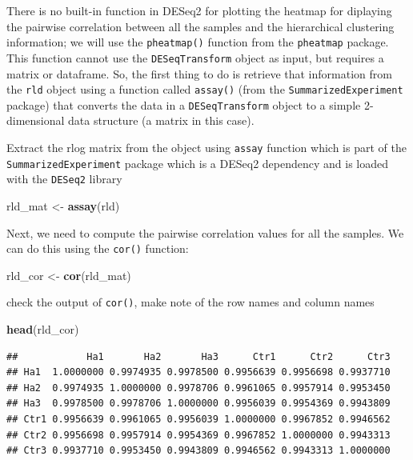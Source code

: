 \documentclass[
]{article}
\newenvironment{Shaded}{\begin{snugshade}}{\end{snugshade}}
\newcommand{\FunctionTok}[1]{\textcolor[rgb]{0.13,0.29,0.53}{\textbf{#1}}}
\newcommand{\NormalTok}[1]{#1}
\newcommand{\OtherTok}[1]{\textcolor[rgb]{0.56,0.35,0.01}{#1}}
\begin{document}
There is no built-in function in DESeq2 for plotting the heatmap for
diplaying the pairwise correlation between all the samples and the
hierarchical clustering information; we will use the \texttt{pheatmap()}
function from the \texttt{pheatmap} package. This function cannot use
the \texttt{DESeqTransform} object as input, but requires a matrix or
dataframe. So, the first thing to do is retrieve that information from
the \texttt{rld} object using a function called \texttt{assay()} (from
the \texttt{SummarizedExperiment} package) that converts the data in a
\texttt{DESeqTransform} object to a simple 2-dimensional data structure
(a matrix in this case).

Extract the rlog matrix from the object using \texttt{assay} function
which is part of the \texttt{SummarizedExperiment} package which is a
DESeq2 dependency and is loaded with the \texttt{DESeq2} library

\begin{Shaded}
\begin{Highlighting}[]
\NormalTok{rld\_mat }\OtherTok{\textless{}{-}} \FunctionTok{assay}\NormalTok{(rld)}
\end{Highlighting}
\end{Shaded}

Next, we need to compute the pairwise correlation values for all the
samples. We can do this using the \texttt{cor()} function:

\begin{Shaded}
\begin{Highlighting}[]
\NormalTok{rld\_cor }\OtherTok{\textless{}{-}} \FunctionTok{cor}\NormalTok{(rld\_mat) }
\end{Highlighting}
\end{Shaded}

check the output of \texttt{cor()}, make note of the row names and
column names

\begin{Shaded}
\begin{Highlighting}[]
\FunctionTok{head}\NormalTok{(rld\_cor)}
\end{Highlighting}
\end{Shaded}

\begin{verbatim}
##            Ha1       Ha2       Ha3      Ctr1      Ctr2      Ctr3
## Ha1  1.0000000 0.9974935 0.9978500 0.9956639 0.9956698 0.9937710
## Ha2  0.9974935 1.0000000 0.9978706 0.9961065 0.9957914 0.9953450
## Ha3  0.9978500 0.9978706 1.0000000 0.9956039 0.9954369 0.9943809
## Ctr1 0.9956639 0.9961065 0.9956039 1.0000000 0.9967852 0.9946562
## Ctr2 0.9956698 0.9957914 0.9954369 0.9967852 1.0000000 0.9943313
## Ctr3 0.9937710 0.9953450 0.9943809 0.9946562 0.9943313 1.0000000
\end{verbatim}
\end{document}
